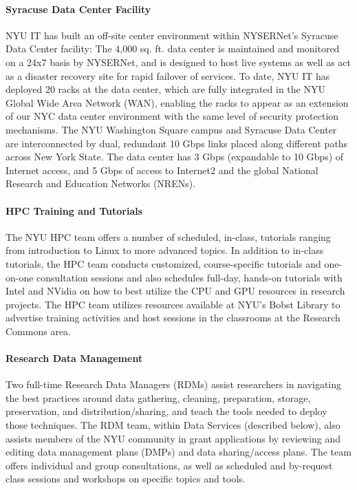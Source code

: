 \paragraph{Syracuse Data Center Facility}
NYU IT has built an off-site center environment within NYSERNet's Syracuse Data Center facility: The 4,000 sq. ft. data center is maintained and monitored on a 24x7 basis by NYSERNet, and is designed to host live systems as well as act as a disaster recovery site for rapid failover of services.  To date, NYU IT has deployed 20 racks at the data center, which are fully integrated in the NYU Global Wide Area Network (WAN), enabling the racks to appear as an extension of our NYC data center environment with the same level of security protection mechanisms. The NYU Washington Square campus and Syracuse Data Center are interconnected by dual, redundant 10 Gbps links placed along different paths across New York State.  The data center has 3 Gbps (expandable to 10 Gbps) of Internet access, and 5 Gbps of access to Internet2 and the global National Research and Education Networks (NRENs).

\paragraph{HPC Training and Tutorials}
The NYU HPC team offers a number of scheduled, in-class, tutorials ranging from introduction to Linux to more advanced topics. In addition to in-class tutorials, the HPC team conducts customized, course-specific tutorials and one-on-one consultation sessions and also schedules full-day, hands-on tutorials with Intel and NVidia on how to best utilize the CPU and GPU resources in research projects. The HPC team utilizes resources available at NYU's Bobst Library to advertise training activities and host sessions in the classrooms at the Research Commons area.

\paragraph{Research Data Management}
Two full-time Research Data Managers (RDMs) assist researchers in navigating the best practices around data gathering, cleaning, preparation, storage, preservation, and distribution/sharing, and teach the tools needed to deploy those techniques. The RDM team, within Data Services (described below), also assists members of the NYU community in grant applications by reviewing and editing data management plans (DMPs) and data sharing/access plans. The team offers individual and group consultations, as well as scheduled and by-request class sessions and workshops on specific topics and tools.

